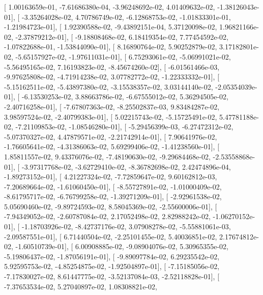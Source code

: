 \documentclass{article}
\begin{document}
       [  1.00163659e-01,  -7.61686380e-04,  -3.96248692e-02,
          4.01409632e-02,  -1.38126043e-01],
       [ -3.35264028e-02,   4.70786749e-02,  -6.12868753e-02,
         -1.01833301e-01,  -1.21984723e-01],
       [  1.92390588e-02,  -9.43892151e-04,   5.37120098e-02,
          1.96821166e-02,  -2.37879212e-01],
       [ -9.18808468e-02,   6.18419354e-02,   7.77454592e-02,
         -1.07822688e-01,  -1.53844090e-01],
       [  8.16890764e-02,   5.90252879e-02,   3.17182801e-02,
         -5.65157927e-02,  -1.97611031e-01],
       [  6.75293061e-02,  -5.06991021e-02,  -5.56495165e-02,
          7.16193823e-02,  -8.45674260e-02],
       [ -6.01561466e-03,  -9.97625808e-02,  -4.71914238e-02,
          3.07782772e-02,  -1.22333332e-01],
       [ -5.15162511e-02,  -5.43897380e-02,  -3.15538357e-02,
          3.03144140e-02,  -2.05354039e-01],
       [ -6.13530253e-02,   3.88663786e-02,  -6.67555012e-02,
          5.36294505e-02,  -2.40716258e-01],
       [ -7.67807363e-02,  -8.25502837e-03,   9.83484287e-02,
          3.98597524e-02,  -2.40799383e-01],
       [  5.02215743e-02,  -5.15725491e-02,   5.47781188e-02,
         -7.21109853e-02,  -1.08546280e-01],
       [ -5.29456399e-03,  -6.27472312e-02,  -5.07370327e-02,
          4.47879571e-02,  -2.21742914e-01],
       [  7.90641976e-02,  -1.76605641e-02,  -4.31386063e-02,
          5.69299406e-02,  -1.41238560e-01],
       [  1.85811557e-02,   9.43376076e-02,  -7.48190630e-02,
         -9.29684468e-02,  -2.53558868e-01],
       [ -3.97317768e-02,  -3.62729410e-02,  -8.36782698e-02,
          2.42474896e-04,  -1.89273152e-01],
       [  4.21227324e-02,  -7.72859647e-02,   9.60162812e-03,
         -7.20689664e-02,  -1.61060450e-01],
       [ -8.55727891e-02,  -1.01000409e-02,  -8.61795717e-02,
         -6.76799258e-02,  -1.39271209e-01],
       [ -2.92961538e-02,   5.05690460e-02,  -9.89724593e-02,
          8.58045369e-02,  -2.55600006e-01],
       [ -7.94349052e-02,  -2.60787084e-02,   2.17052498e-02,
          2.82988242e-02,  -1.06270152e-01],
       [ -1.18703926e-02,  -8.42737176e-02,   3.07908278e-02,
         -5.55881061e-03,  -2.09587551e-01],
       [  6.71440504e-02,  -2.25101455e-02,   5.40036851e-02,
          2.17674812e-02,  -1.60510739e-01],
       [  6.00908885e-02,  -9.08904076e-02,   5.30965355e-02,
         -5.19806437e-02,  -1.87056191e-01],
       [ -9.89097784e-02,   6.29235542e-02,   5.92595753e-02,
         -4.85254875e-02,  -1.92504897e-01],
       [ -7.15185056e-02,  -7.17830027e-02,   8.61447775e-02,
         -3.52137084e-03,  -2.52118828e-01],
       [ -7.37653534e-02,   5.27040897e-02,   1.08308821e-02,
\end{document}
